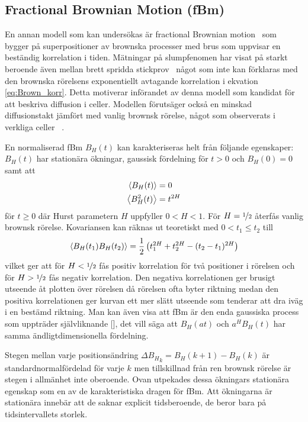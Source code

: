\subsection{Fractional Brownian Motion (fBm)}

En annan modell som kan undersökas är fractional Brownian motion~\cite{Mandelbrot_fBm1968} som bygger på superpositioner av brownska processer med brus som uppvisar en beständig korrelation i tiden. Mätningar på slumpfenomen har visat på starkt beroende även mellan brett spridda stickprov~\cite{Mandelbrot_fBm1968} något som inte kan förklaras med den brownska rörelsens exponentiellt avtagande korrelation i ekvation \eqref{eq:Brown_korr}. Detta motiverar införandet av denna modell som kandidat för att beskriva   diffusion i celler. Modellen förutsäger också en minskad diffusionstakt jämfört med vanlig brownsk rörelse, något som observerats i verkliga celler ~\cite{Hofling&Franosch2013}.

En normaliserad fBm $B_H(t)$ kan karakteriseras helt från följande egenskaper\cite{Dieker_fBm}: $B_H(t)$ har stationära ökningar, gaussisk fördelning för $t>0$ och $B_H(0)=0$ samt att
\begin{align}
    \ev{B_H(t)}&=0 \\
    \ev{B^2_H(t)}&=t^{2H}
\end{align}
för $t\geq 0$ där Hurst parametern $H$ uppfyller $0< H <1$. För $H=\nicefrac{1}{2}$ återfås vanlig brownsk rörelse. Kovariansen kan räknas ut teoretiskt med $0<
t_1\leq t_2$ till
\begin{equation}
\ev{B_H(t_1)B_H(t_2)}
= \frac{1}{2} \left(t_1^{2H}+t_2^{2H}-(t_2-t_1)^{2H}\right)
\end{equation}
vilket ger att för $H<\nicefrac{1}{2}$ fås positiv korrelation för två positioner i rörelsen och för  $H>\nicefrac{1}{2}$ fås negativ korrelation. Den negativa korrelationen ger brusigt utseende åt plotten över rörelsen då rörelsen ofta byter riktning medan den positiva korrelationen ger kurvan ett mer slätt utseende som tenderar att dra iväg i en bestämd riktning. Man kan även visa att fBm är den enda gaussiska process som uppträder självliknande [], det vill säga att $B_H(at)$ och $a^H B_H(t)$ har samma ändligtdimensionella fördelning.

Stegen mellan varje positionsändring $\Delta{B_H}_k=B_H(k+1)-B_H(k)$ är standardnormalfördelad för varje $k$ men tillskillnad från ren brownsk rörelse är stegen i allmänhet inte oberoende. Ovan utpekades dessa ökningars stationära egenskap som en av de karakteristiska dragen för fBm. Att ökningarna är stationära innebär att de saknar explicit tidsberoende, de beror bara på tidsintervallets storlek.

